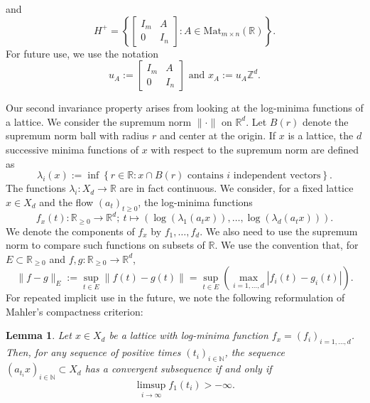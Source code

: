 \documentclass[reqno,11pt]{amsart}
\theoremstyle{plain}
\newtheorem{lem}[thm]{Lemma}
\theoremstyle{definition}
\theoremstyle{remark}
\numberwithin{equation}{section}
\newcommand{\R}{{\mathbb{R}}}
\newcommand{\Z}{{\mathbb{Z}}}
\newcommand{\N}{{\mathbb{N}}}
\begin{document}
and
\begin{equation*}
    H^+ = \left\lbrace  \left[ {\begin{array}{cc}
   I_m & A  \\
   0 & I_n 
  \end{array} } \right] : A \in \text{Mat}_{m\times n}(\R)\right\rbrace.
\end{equation*}
For future use, we use the notation
\begin{equation}\label{u_A}
    u_A := \left[ {\begin{array}{cc}
   I_m & A  \\
   0 & I_n 
  \end{array} } \right] \text{ and } x_A := u_A \Z^d.
\end{equation}

Our second invariance property arises from looking at the log-minima functions of a lattice.
We consider the supremum norm $\|\cdot \|$ on $\R^d$. Let $B(r)$ denote the supremum norm ball with radius $r$ and center at the origin. If $x$ is a lattice,
the $d$ successive minima functions of $x$ with respect to the supremum norm are defined as
\begin{equation*}
    \lambda_i(x) := \inf \left\lbrace r \in \R :  x\cap B(r) \text{ contains $i$ independent vectors}\right\rbrace.
\end{equation*}
The functions $\lambda_i : X_d \to \R$ are in fact continuous. We consider, for a fixed lattice $x \in X_d$ and the flow $(a_t)_{t\geq 0}$, the log-minima functions
\begin{equation}\label{log-minima-x}
    f_x(t): \R_{\geq 0} \to \R^d;\ t\mapsto \left(\log(\lambda_1(a_tx)), \dots, \log(\lambda_d(a_tx))\right).
\end{equation}
We denote the components of $f_x$ by $f_1, \dots, f_d$.
We also need to use the supremum norm to compare such functions on subsets of $\R$. We use the convention that, for $E \subset \R_{\geq 0}$ and $f,g: \R_{\geq 0} \to \R^d$,
\begin{equation}
    \|f-g\|_E := \sup_{t \in E} \|f(t) - g(t)\| = \sup_{t\in E} \left(\max_{i=1,\dots, d} |f_i(t)-g_i(t)|\right).
\end{equation}
For repeated implicit use in the future, we note the following reformulation of Mahler's compactness criterion:
\begin{lem}\label{Mahlerc}
    Let $x \in X_d$ be a lattice with log-minima function $f_x=(f_i)_{i=1,\dots,d}$. Then, for any sequence of positive times $(t_i)_{i \in \N}$, the sequence $(a_{t_i}x)_{i \in \N} \subset X_d$ has a convergent subsequence if and only if
    \begin{equation*}
        \limsup_{i \to \infty} f_1(t_i) > -\infty.
    \end{equation*}
\end{lem}
\end{document}
